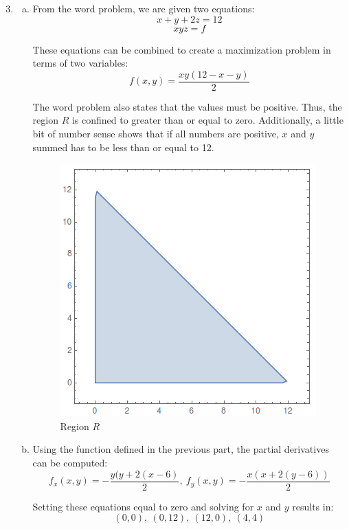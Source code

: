 \documentclass{article}
\begin{document}
\begin{enumerate}[1.]
  \setcounter{enumi}{2}
  \item \begin{enumerate}[a.]
      \item From the word problem, we are given two equations:
        $$ x + y + 2z = 12 $$
        $$ xyz = f $$

        These equations can be combined to create a maximization problem in
        terms of two variables:
        $$ f(x, y) = \frac{ x y (12 - x - y) }{ 2 } $$

        The word problem also states that the values must be positive. Thus, the
        region $R$ is confined to greater than or equal to zero. Additionally, a
        little bit of number sense shows that if all numbers are positive, $x$
        and $y$ summed has to be less than or equal to 12.

        \begin{figure}[H]
          \centering
          \includegraphics[scale=0.60]{"RegionR"}
          \caption{Region $R$}
        \end{figure}

      \item Using the function defined in the previous part, the partial
        derivatives can be computed:
        $$ f_{x}(x, y) = -\frac{ y (y + 2(x - 6) }{ 2 },\ f_{y}(x, y) = -\frac{
        x (x + 2 (y - 6))}{ 2 } $$

        Setting these equations equal to zero and solving for $x$ and $y$
        results in:
        $$ (0, 0),\ (0, 12),\ (12, 0),\ (4, 4)  $$


\end{enumerate}
\end{enumerate}
\end{document}
